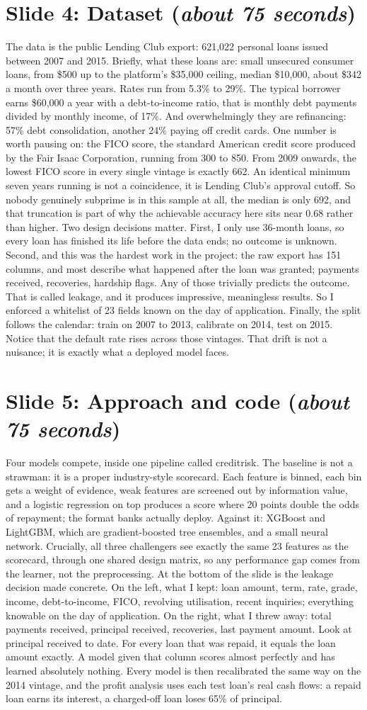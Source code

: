 \documentclass[a4paper,11pt]{article}
\newcommand{\slideblock}[3]{%
  \section*{Slide #1: #2 \hfill \normalfont\small(\textit{#3})}}
\begin{document}
\slideblock{4}{Dataset}{about 75 seconds}
The data is the public Lending Club export: 621,022 personal loans issued between 2007 and 2015. Briefly, what these loans are: small unsecured consumer loans, from \$500 up to the platform's \$35,000 ceiling, median \$10,000, about \$342 a month over three years. Rates run from 5.3\% to 29\%. The typical borrower earns \$60,000 a year with a debt-to-income ratio, that is monthly debt payments divided by monthly income, of 17\%. And overwhelmingly they are refinancing: 57\% debt consolidation, another 24\% paying off credit cards. One number is worth pausing on: the FICO score, the standard American credit score produced by the Fair Isaac Corporation, running from 300 to 850. From 2009 onwards, the lowest FICO score in every single vintage is exactly 662. An identical minimum seven years running is not a coincidence, it is Lending Club's approval cutoff. So nobody genuinely subprime is in this sample at all, the median is only 692, and that truncation is part of why the achievable accuracy here sits near 0.68 rather than higher. Two design decisions matter. First, I only use 36-month loans, so every loan has finished its life before the data ends; no outcome is unknown. Second, and this was the hardest work in the project: the raw export has 151 columns, and most describe what happened after the loan was granted; payments received, recoveries, hardship flags. Any of those trivially predicts the outcome. That is called leakage, and it produces impressive, meaningless results. So I enforced a whitelist of 23 fields known on the day of application. Finally, the split follows the calendar: train on 2007 to 2013, calibrate on 2014, test on 2015. Notice that the default rate rises across those vintages. That drift is not a nuisance; it is exactly what a deployed model faces.

\slideblock{5}{Approach and code}{about 75 seconds}
Four models compete, inside one pipeline called creditrisk. The baseline is not a strawman: it is a proper industry-style scorecard. Each feature is binned, each bin gets a weight of evidence, weak features are screened out by information value, and a logistic regression on top produces a score where 20 points double the odds of repayment; the format banks actually deploy. Against it: XGBoost and LightGBM, which are gradient-boosted tree ensembles, and a small neural network. Crucially, all three challengers see exactly the same 23 features as the scorecard, through one shared design matrix, so any performance gap comes from the learner, not the preprocessing. At the bottom of the slide is the leakage decision made concrete. On the left, what I kept: loan amount, term, rate, grade, income, debt-to-income, FICO, revolving utilisation, recent inquiries; everything knowable on the day of application. On the right, what I threw away: total payments received, principal received, recoveries, last payment amount. Look at principal received to date. For every loan that was repaid, it equals the loan amount exactly. A model given that column scores almost perfectly and has learned absolutely nothing. Every model is then recalibrated the same way on the 2014 vintage, and the profit analysis uses each test loan's real cash flows: a repaid loan earns its interest, a charged-off loan loses 65\% of principal.
\end{document}

